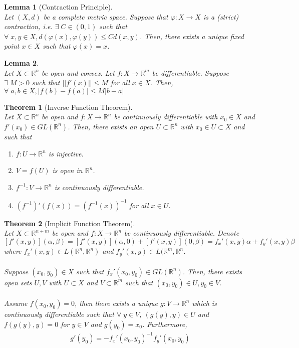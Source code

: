 \documentclass[10pt,a4paper]{article}
\newtheorem{theorem}{Theorem}
\newtheorem{lemma}{Lemma}
\theoremstyle{definition}
\theoremstyle{definition}
\numberwithin{equation}{section}
\numberwithin{theorem}{section}
\numberwithin{proposition}{section}
\numberwithin{lemma}{section}
\numberwithin{corollary}{section}
\begin{document}
\begin{lemma}[Contraction Principle]$ $
\\Let $(X, d)$ be a complete metric space. Suppose that $\varphi: X \to X$ is a (strict) contraction, i.e. $\exists \; C \in (0, 1)$ such that $\forall \; x, y \in X, d(\varphi(x), \varphi(y)) \leq Cd(x, y)$. Then, there exists a unique fixed point $x \in X$ such that $\varphi(x) = x$. 
\end{lemma}

\begin{lemma}$ $
\\Let $X \subset \mathbb{R}^n$ be open and convex. Let $f: X \to \mathbb{R}^m$ be differentiable. Suppose $\exists \; M > 0$ such that $||f'(x)|| \leq M$ for all $x \in X$. Then, $\forall \; a, b \in X, |f(b) - f(a)| \leq M|b - a|$
\end{lemma}

\begin{theorem}[Inverse Function Theorem]$ $
\\Let $X \subset \mathbb{R}^n$ be open and $f: X \to \mathbb{R}^n$ be continuously differentiable with $x_0 \in X$ and $f'(x_0) \in GL(\mathbb{R}^n)$. Then, there exists an open $U \subset \mathbb{R}^n$ with $x_0 \in U \subset X$ and such that 
\begin{enumerate}
\item $f: U \to \mathbb{R}^n$ is injective. 
\item $V = f(U)$ is open in $\mathbb{R}^n$.
\item $f^{-1}: V \to \mathbb{R}^n$ is continuously differentiable.
\item $(f^{-1})'(f(x)) = (f^{-1}(x))^{-1}$ for all $x \in U$. 
\end{enumerate}
\end{theorem}

\begin{theorem}[Implicit Function Theorem]$ $
\\Let $X \subset \mathbb{R}^{n+m}$ be open and $f: X \to \mathbb{R}^n$ be continuously differentiable. Denote $[f'(x, y)](\alpha, \beta) = [f'(x, y)](\alpha, 0) + [f'(x, y)](0, \beta) = f_x'(x, y)\alpha + f_y'(x, y)\beta$ where $f_x'(x, y) \in L(\mathbb{R}^n, \mathbb{R}^n)$ and $f_y'(x, y) \in L(\mathbb{R}^m, \mathbb{R}^n$.
\\
\\Suppose $(x_0, y_0) \in X$ such that $f_x'(x_0, y_0) \in GL(\mathbb{R}^n)$. Then, there exists open sets $U, V$ with $U \subset X$ and $V \subset \mathbb{R}^m$ such that $(x_0, y_0) \in U, y_0 \in V$. 
\\
\\Assume $f(x_0, y_0) = 0$, then there exists a unique $g: V \to \mathbb{R}^n$ which is continuously differentiable such that $\forall \; y \in V$, $(g(y), y) \in U$ and $f(g(y), y) = 0$ for $y \in V$ and $g(y_0) = x_0$. Furthermore,
\begin{align*}
g'(y_0) = -f_x'(x_0, y_0)^{-1}f_y'(x_0, y_0)
\end{align*}
\end{theorem}
\end{document}
